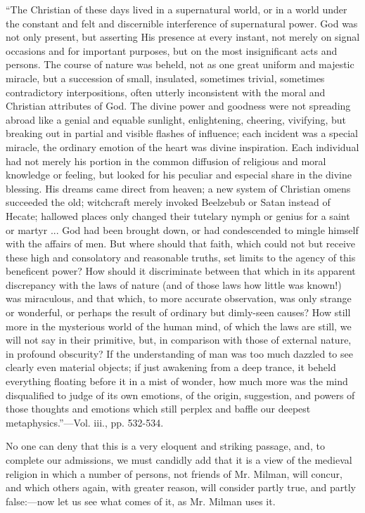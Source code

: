 ``The
Christian of these days lived in a supernatural world, or in a world
under the constant and felt and discernible interference of
supernatural power. God was not
only present, but asserting His presence at every instant, not merely
on signal occasions and for important purposes, but on the most
insignificant acts and persons. The course of nature was beheld, not
as one great uniform and majestic miracle, but a succession of small,
insulated, sometimes trivial, sometimes contradictory interpositions,
often utterly inconsistent with the moral and Christian attributes of
God. The divine power and goodness were not spreading abroad like a
genial and equable sunlight, enlightening, cheering, vivifying, but
breaking out in partial and visible flashes of influence; each
incident was a special miracle, the ordinary emotion of the heart was
divine inspiration. Each individual had not merely his portion in the
common diffusion of religious and moral knowledge or feeling, but
looked for his peculiar and especial share in the divine blessing. His
dreams came direct from heaven; a new system of Christian omens
succeeded the old; witchcraft merely invoked Beelzebub or Satan
instead of Hecate; hallowed places only changed their tutelary nymph
or genius for a saint or martyr ... God had been brought down, or had
condescended to mingle himself with the affairs of men. But where
should that faith, which could not but receive these high and
consolatory and reasonable truths, set limits to the agency of this
beneficent power? How should it discriminate between that which in its
apparent discrepancy with the laws of nature (and of those laws how
little was known!) was miraculous, and that which, to more accurate
observation, was only strange or wonderful, or perhaps the result of
ordinary but dimly-seen causes? How still more in the mysterious world
of the human mind, of which the laws are still, we will not say in
their primitive, but, in comparison with those of external nature, in
profound obscurity? If the understanding of man was too much dazzled
to see clearly even material objects; if just awakening from a deep
trance, it beheld everything floating before it in a mist of wonder,
how much more was the mind disqualified to judge of its own emotions,
of the origin, suggestion, and powers of those thoughts and emotions
which still perplex and baffle our deepest metaphysics.''—Vol. iii.,
pp. 532-534.

No one can deny that this is a very eloquent and
striking passage, and, to complete our admissions, we must candidly
add that it is a view of the medieval religion in which a number
of persons, not friends of Mr. Milman, will concur, and which others
again, with greater reason, will consider partly true, and partly
false:—now let us see what comes of it, as Mr. Milman uses it.

